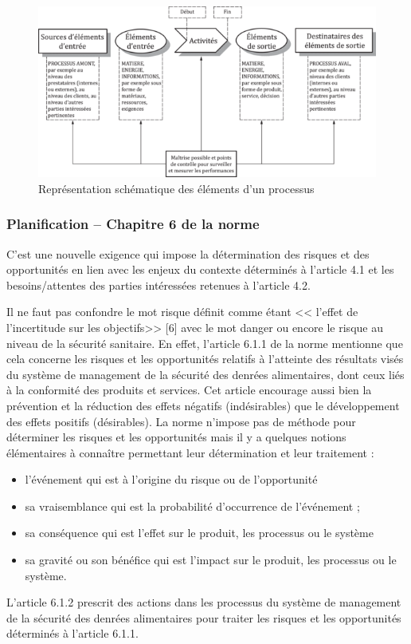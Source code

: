 \begin{spacing}{1.2}
\begin{figure}[!ht]\centering
\includegraphics[scale=9]{image6.png}
\caption{ Représentation schématique des éléments d’un processus }
\label{fig:fig1}
\end{figure}


\subsubsection{Planification – Chapitre 6 de la norme}

C’est une nouvelle exigence qui impose la détermination des risques et des opportunités en lien avec les enjeux du contexte déterminés à l’article 4.1 et les besoins/attentes des parties intéressées retenues à l’article 4.2.

Il ne faut pas  confondre le mot risque définit comme étant << l’effet de l’incertitude sur les objectifs>> [6] avec le mot danger ou encore le risque au niveau de la sécurité sanitaire. En effet, l’article 6.1.1 de la norme mentionne que cela concerne les risques et les opportunités relatifs à l’atteinte des résultats visés du système de management de la sécurité des denrées alimentaires, dont ceux liés à la conformité des produits et services.
 Cet article encourage aussi bien la prévention et la réduction des effets négatifs (indésirables) que le développement des effets positifs (désirables).
La norme n’impose pas de méthode pour déterminer les risques et les opportunités mais il y a quelques notions élémentaires à connaître  permettant leur détermination et leur traitement :

\begin{itemize}
	\item l’événement qui est à l’origine du risque ou de l’opportunité
	\item sa vraisemblance qui est la probabilité d’occurrence de l’événement ;
\item sa conséquence qui est l’effet sur le produit, les processus ou le système
\item sa gravité ou son bénéfice qui est l’impact sur le produit, les processus ou le système.
\end{itemize}


L’article 6.1.2 prescrit des actions dans les processus du système de management de la sécurité des denrées alimentaires pour traiter les risques et les opportunités déterminés à l’article 6.1.1.
\end{spacing}
